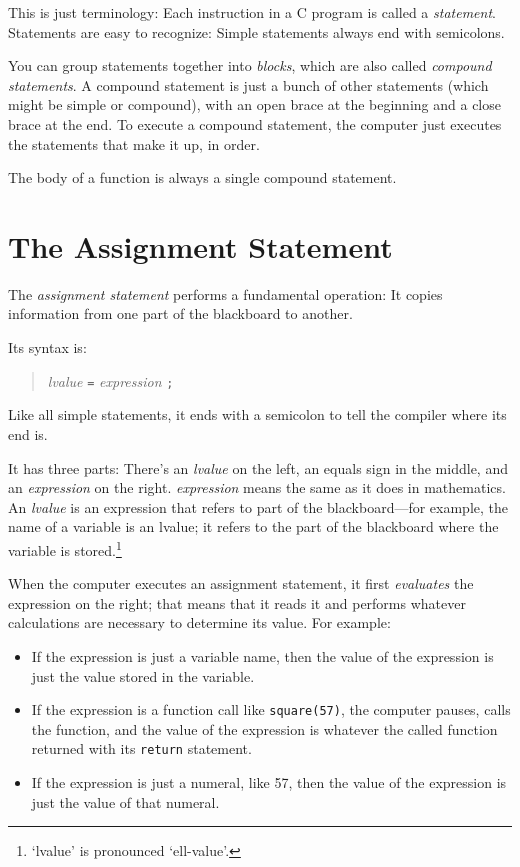     This is just terminology: Each instruction in a C program is called
a {\em statement}\/.  Statements are easy to recognize: Simple
statements always end with semicolons.

    You can group statements together into {\em blocks}, which are also
called {\em compound statements}.  A compound statement is just a bunch
of other statements (which might be simple or compound), with an open
brace at the beginning and a close brace at the end.  To execute a
compound statement, the computer just executes the statements that make
it up, in order.

The body of a function is always a single compound statement.

\section{The Assignment Statement}

The {\em assignment statement} performs a fundamental operation:  It
copies information from one part of the blackboard to another.

Its syntax is:

\begin{quotation}
	{\it lvalue} {\tt =} {\it expression} {\tt ;}
\end{quotation}

Like all simple statements, it ends with a semicolon to tell the
compiler where its end is.

It has three parts: There's an {\em lvalue} on the left, an equals sign
in the middle, and an {\em expression} on the right.  {\em expression}
means the same as it does in mathematics.  An {\em lvalue} is an
expression that refers to part of the blackboard---for example, the name
of a variable is an lvalue; it refers to the part of the blackboard
where the variable is stored.\footnote{`lvalue' is pronounced
`ell-value'.}

When the computer executes an assignment statement, it first {\em
evaluates} the expression on the right; that means that it reads it and
performs whatever calculations are necessary to determine its value.
For example:
\begin{itemize} 

\item If the expression is just a variable name, then the value
of the expression is just the value stored in the variable.  

\item If the
expression is a function call like {\tt square(57)}, the computer
pauses, calls the function, and the value of the expression is whatever
the called function returned with its {\tt return} statement.  

\item If the expression is just a numeral, like 57, then the value of the
expression is just the value of that numeral.

\end{itemize}

